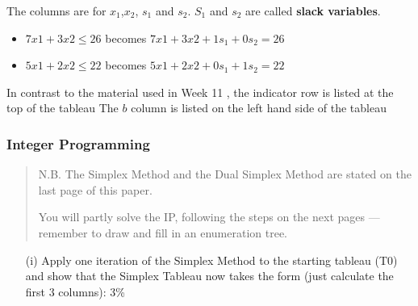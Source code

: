 \documentclass{beamer}
\begin{document}
\begin{frame}

The columns are for $x_1$,$x_2$, $s_1$ and $s_2$. 
$S_1$ and $s_2$ are called \textbf{slack variables}.

\begin{itemize}
\item $7x1 + 3x2 \leq 26$ becomes $7x1 + 3x2 + 1s_1+0s_2= 26$ 
\item $5x1 + 2x2 \leq 22$ becomes $5x1 + 2x2 + 0s_1+1s_2= 22$
\end{itemize}

 In contrast to the material used in Week 11 , the indicator row is listed at the top of the tableau
The $b$ column is listed on the left hand side of the tableau


\begin{frame}
	\frametitle{Integer Programming}
\large
\begin{itemize}

\end{itemize}
\end{frame}
\begin{frame}
\begin{quote}
N.B. The Simplex Method and the Dual Simplex Method are stated on
the last page of this paper.


You will partly solve the IP, following the steps on the next pages — remember
to draw and fill in an enumeration tree.
\end{quote}
\end{frame}
\begin{frame}
\begin{itemize}
\item[(i)] Apply one iteration of the Simplex Method to the starting tableau
(T0) and show that the Simplex Tableau now takes the form (just
calculate the first 3 columns): 3\%
\end{itemize}


\end{frame}
\end{frame}
\end{document}
